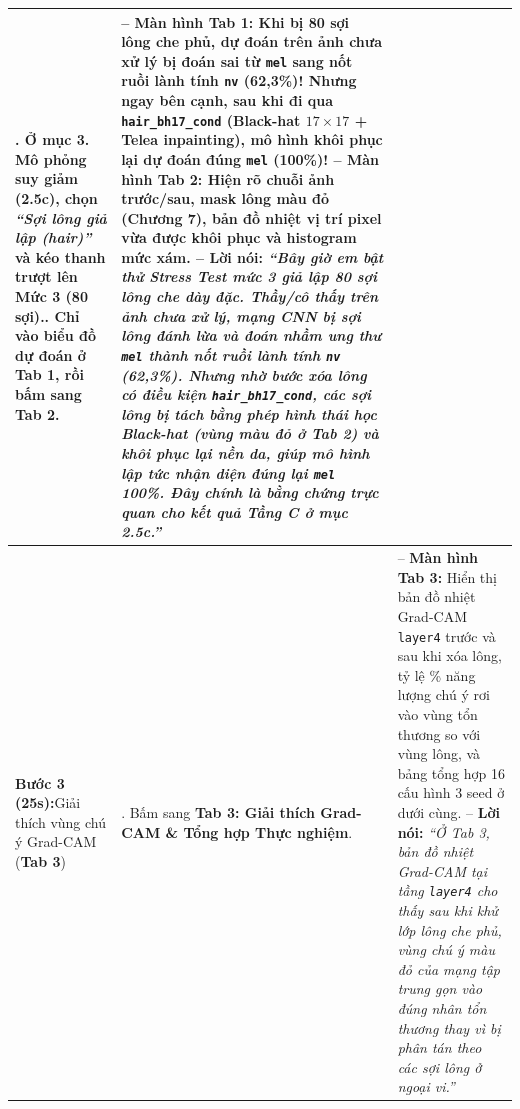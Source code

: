 \documentclass[11pt,a4paper]{article}
\begin{document}
\begin{tabularx}{\textwidth}{>{\bfseries\raggedright\arraybackslash}p{2.5cm} >{\raggedright\arraybackslash}p{4.6cm} X}
3. Ở mục \textbf{3. Mô phỏng suy giảm (2.5c)}, chọn \emph{``Sợi lông giả lập (hair)''} và kéo thanh trượt lên \textbf{Mức 3 (80 sợi)}.\newline
4. Chỉ vào biểu đồ dự đoán ở \textbf{Tab 1}, rồi bấm sang \textbf{Tab 2}. &
-- \textbf{Màn hình Tab 1:} Khi bị 80 sợi lông che phủ, dự đoán trên ảnh chưa xử lý bị \textbf{đoán sai từ \texttt{mel} sang nốt ruồi lành tính \texttt{nv} (62,3\%)}! Nhưng ngay bên cạnh, sau khi đi qua \texttt{hair\_bh17\_cond} (Black-hat $17\times 17$ + Telea inpainting), mô hình \textbf{khôi phục lại dự đoán đúng \texttt{mel} (100\%)}!\newline
-- \textbf{Màn hình Tab 2:} Hiện rõ chuỗi ảnh trước/sau, mask lông màu đỏ (Chương 7), bản đồ nhiệt vị trí pixel vừa được khôi phục và histogram mức xám.\newline
-- \textbf{Lời nói:} \emph{``Bây giờ em bật thử Stress Test mức 3 giả lập 80 sợi lông che dày đặc. Thầy/cô thấy trên ảnh chưa xử lý, mạng CNN bị sợi lông đánh lừa và đoán nhầm ung thư \texttt{mel} thành nốt ruồi lành tính \texttt{nv} (62,3\%). Nhưng nhờ bước xóa lông có điều kiện \texttt{hair\_bh17\_cond}, các sợi lông bị tách bằng phép hình thái học Black-hat (vùng màu đỏ ở Tab 2) và khôi phục lại nền da, giúp mô hình lập tức nhận diện đúng lại \texttt{mel} 100\%. Đây chính là bằng chứng trực quan cho kết quả Tầng C ở mục 2.5c.''} \\
\midrule
\textbf{Bước 3 (25s):}\newline Giải thích vùng chú ý Grad-CAM (\textbf{Tab 3}) &
1. Bấm sang \textbf{Tab 3: Giải thích Grad-CAM \& Tổng hợp Thực nghiệm}. &
-- \textbf{Màn hình Tab 3:} Hiển thị bản đồ nhiệt Grad-CAM \texttt{layer4} trước và sau khi xóa lông, tỷ lệ \% năng lượng chú ý rơi vào vùng tổn thương so với vùng lông, và bảng tổng hợp 16 cấu hình 3 seed ở dưới cùng.\newline
-- \textbf{Lời nói:} \emph{``Ở Tab 3, bản đồ nhiệt Grad-CAM tại tầng \texttt{layer4} cho thấy sau khi khử lớp lông che phủ, vùng chú ý màu đỏ của mạng tập trung gọn vào đúng nhân tổn thương thay vì bị phân tán theo các sợi lông ở ngoại vi.''} \\
\bottomrule
\end{tabularx}

\end{document}
